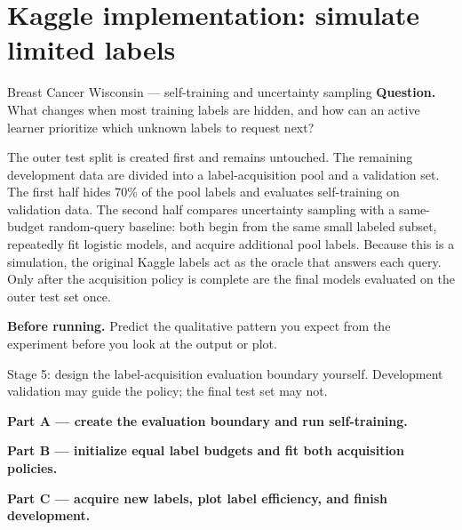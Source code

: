 \section{Kaggle implementation: simulate limited labels}
\label{sec:kaggle-breast-limited-labels}

\begin{kaggleproject}{Breast Cancer Wisconsin --- self-training and uncertainty sampling}
\textbf{Question.} What changes when most training labels are hidden, and how can an active learner prioritize which unknown labels to request next?
\end{kaggleproject}

The outer test split is created first and remains untouched. The remaining development data are divided into a label-acquisition pool and a validation set. The first half hides 70\% of the pool labels and evaluates self-training on validation data. The second half compares uncertainty sampling with a same-budget random-query baseline: both begin from the same small labeled subset, repeatedly fit logistic models, and acquire additional pool labels. Because this is a simulation, the original Kaggle labels act as the oracle that answers each query. Only after the acquisition policy is complete are the final models evaluated on the outer test set once.

\textbf{Before running.} Predict the qualitative pattern you expect from the experiment before you look at the output or plot.

\begin{labmode}
Stage 5: design the label-acquisition evaluation boundary yourself. Development validation may guide the policy; the final test set may not.
\end{labmode}

\textbf{Part A --- create the evaluation boundary and run self-training.}



\textbf{Part B --- initialize equal label budgets and fit both acquisition policies.}



\textbf{Part C --- acquire new labels, plot label efficiency, and finish development.}

